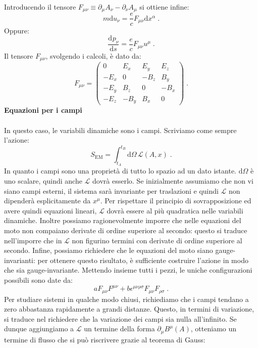 \documentclass[12pt,a4paper]{report}
\theoremstyle{definition}
\newcommand{\dev}[3][]{\frac{\mathrm{d}^{#1} #2}{\mathrm{d} #3^{#1}}}
\newcommand{\lag}{\mathcal{L}}
\newcommand{\diff}[1][]{\mathrm{d}#1}
\begin{document}
Introducendo il tensore $F_{\mu\nu}\equiv \partial_{\mu}A_{\nu}-\partial_{\nu}A_{\mu}$ si ottiene infine:
\begin{equation}
m\diff{u_{\nu}}=\frac{e}{c}F_{\mu\nu}\diff{x^{\alpha}}\;.
\end{equation}
Oppure:
\begin{equation}
\dev{p_{\nu}}{s}=\frac{e}{c}F_{\mu\nu}u^{\mu}\;.
\end{equation}
Il tensore $F_{\mu\nu}$, svolgendo i calcoli, è dato da:
\begin{equation}
F_{\mu\nu}=\left(\begin{matrix}
0 & E_x & E_y & E_z \\
-E_x & 0 & -B_z & B_y \\
-E_y & B_z & 0 & -B_x \\
-E_z & -B_y & B_x & 0
\end{matrix}\right)\;.
\end{equation}
\textbf{Equazioni per i campi} \\
\\
In questo caso, le variabili dinamiche sono i campi. Scriviamo come sempre l'azione:
$$
S_{\mathrm{EM}}=\int_{t_A}^{t_B}\diff{\Omega}\,\lag(A,x)\;.
$$
In quanto i campi sono una proprietà di tutto lo spazio ad un dato istante. $\diff{\Omega}$ è uno scalare, quindi anche $\lag$ dovrà esserlo. Se inizialmente assumiamo che non vi siano campi esterni, il sistema sarà invariante per traslazioni e quindi $\lag$ non dipenderà esplicitamente da $x^{\mu}$. Per rispettare il principio di sovrapposizione ed avere quindi equazioni lineari, $\lag$ dovrà essere al più quadratica nelle variabili dinamiche. Inoltre possiamo ragionevolmente imporre che nelle equazioni del moto non compaiano derivate di ordine superiore al secondo: questo si traduce nell'imporre che in $\lag$ non figurino termini con derivate di ordine superiore al secondo. Infine, possiamo richiedere che le equazioni del moto siano gauge-invarianti: per ottenere questo risultato, è sufficiente costruire l'azione in modo che sia gauge-invariante. Mettendo insieme tutti i pezzi, le uniche configurazioni possibili sono date da:
$$
aF_{\mu\nu}F^{\mu\nu}+b\epsilon^{\mu\nu\rho\sigma}F_{\mu\nu}F_{\rho\sigma}\;.
$$
Per studiare sistemi in qualche modo chiusi, richiediamo che i campi tendano a zero abbastanza rapidamente a grandi distanze. Questo, in termini di variazione, si traduce nel richiedere che la variazione dei campi sia nulla all'infinito. Se dunque aggiungiamo a $\lag$ un termine della forma $\partial_{\mu}B^{\mu}(A)$, otteniamo un termine di flusso che si può riscrivere grazie al teorema di Gauss:
\end{document}
